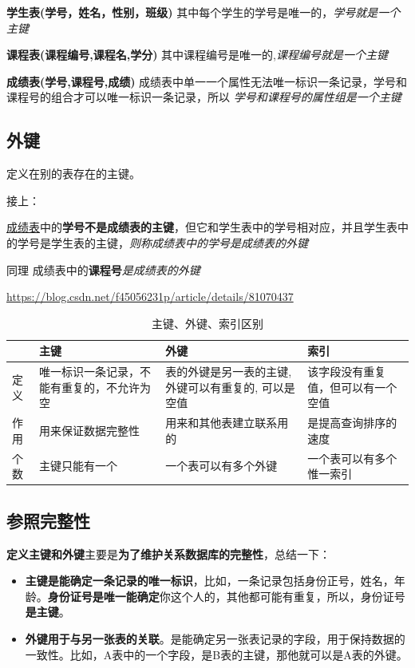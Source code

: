 \documentclass[UTF8,a4paper,12pt]{ctexbook}
\begin{document}
			\textbf{学生表(学号，姓名，性别，班级)} 其中每个学生的学号是唯一的，\textit{学号就是一个主键} 
			
			\textbf{课程表(课程编号,课程名,学分)} 其中课程编号是唯一的,\textit{课程编号就是一个主键} 
			
			\textbf{成绩表(学号,课程号,成绩)} 成绩表中单一一个属性无法唯一标识一条记录，学号和课程号的组合才可以唯一标识一条记录，所以 \textit{学号和课程号的属性组是一个主键} 
			
		\subsection{外键}
			定义在别的表存在的主键。
			
			接上：
			
			\underline{成绩表}中的\textbf{学号不是成绩表的主键}，但它和学生表中的学号相对应，并且学生表中的学号是学生表的主键，\textit{则称成绩表中的学号是成绩表的外键} 
			  
			同理 成绩表中的\textbf{课程号}\textit{是成绩表的外键} 
			
			\url{https://blog.csdn.net/f45056231p/article/details/81070437}
			
			\begin{table}[H]
				\centering
				\caption{主键、外键、索引区别}
				\begin{tabular}{p{0.5cm}<{\centering}|p{5cm}<{\centering}|p{5.5cm}<{\centering}|p{4.5cm}<{\centering}}
					\toprule[1.5pt]
							 & 主键 	&  外键 &  索引\\
					\midrule
						定义 & 唯一标识一条记录，不能有重复的，不允许为空   & 表的外键是另一表的主键, 外键可以有重复的, 可以是空值      & 该字段没有重复值，但可以有一个空值  \\
						\hline
						作用 & 用来保证数据完整性   &  用来和其他表建立联系用的     & 是提高查询排序的速度  \\
						\hline
						个数 & 主键只能有一个   & 一个表可以有多个外键      & 一个表可以有多个惟一索引  \\
					\bottomrule[1.5pt]
				\end{tabular}
			\end{table}
			
		\subsection{参照完整性}
			\textbf{定义主键和外键}主要是\textbf{为了维护关系数据库的完整性}，总结一下：
			
			\begin{itemize}
				\item \textbf{主键是能确定一条记录的唯一标识}，比如，一条记录包括身份正号，姓名，年龄。\textbf{身份证号是唯一能确定}你这个人的，其他都可能有重复，所以，身份证号\textbf{是主键}。
				
				\item \textbf{外键用于与另一张表的关联}。是能确定另一张表记录的字段，用于保持数据的一致性。比如，A表中的一个字段，是B表的主键，那他就可以是A表的外键。
			\end{itemize}
		
\end{document}
